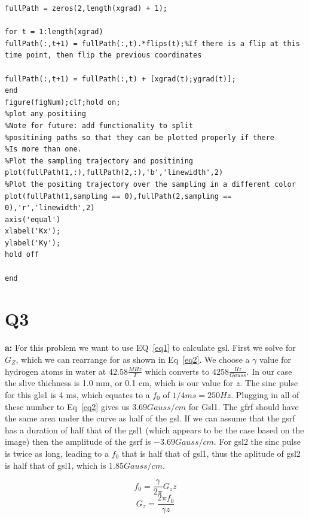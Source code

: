 \documentclass[12pt]{article}
\begin{document}
\begin{lstlisting}[style=Matlab-editor]
fullPath = zeros(2,length(xgrad) + 1);

for t = 1:length(xgrad)
fullPath(:,t+1) = fullPath(:,t).*flips(t);%If there is a flip at this time point, then flip the previous coordinates

fullPath(:,t+1) = fullPath(:,t) + [xgrad(t);ygrad(t)];
end
figure(figNum);clf;hold on;
%plot any positiing
%Note for future: add functionality to split
%positining paths so that they can be plotted properly if there
%Is more than one.
%Plot the sampling trajectory and positining
plot(fullPath(1,:),fullPath(2,:),'b','linewidth',2)
%Plot the positing trajectory over the sampling in a different color
plot(fullPath(1,sampling == 0),fullPath(2,sampling == 0),'r','linewidth',2)
axis('equal')
xlabel('Kx');
ylabel('Ky');
hold off

end
\end{lstlisting}

\section{Q3}
\noindent\textbf{a: }
For this problem we want to use EQ~\ref{eq1} to calculate gsl. First we solve for $G_Z$, which we can rearrange for as shown in Eq~\ref{eq2}. We choose a $\gamma$ value for hydrogen atoms in water at $42.58 \frac{MHz}{T}$ which converts to $4258 \frac{Hz}{Gauss}$. In our case the slive thichness is 1.0 mm, or 0.1 cm, which is our value for $z$. The sinc pulse for this gls1  is 4 ms, which equates to a $f_0$ of $1/4ms = 250 Hz$. Plugging in all of these number to Eq~\ref{eq2} gives us $3.69 Gauss/cm$ for Gsl1. The gfrf should have the same area under the curve as half of the gsl. If we can assume that the gsrf has a duration of half that of the gsl1 (which appears to be the case based on the image) then the amplitude of the gsrf is $-3.69 Gauss/cm$. For gsl2 the sinc pulse is twice as long, leading to a $f_0$ that is half that of gsl1, thus the aplitude of gsl2 is half that of gsl1, which is $1.85 Gauss/cm$.

\begin{equation}
f_0 = \frac{\gamma}{2\pi}G_zz
\label{eq1}
\end{equation}
\begin{equation}
G_z = \frac{2\pi f_0}{\gamma z}
\label{eq2}
\end{equation}
\end{document}
